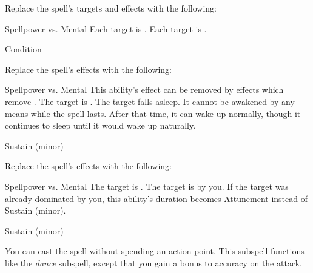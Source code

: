 Replace the spell's targets and effects with the following:
\begin{spellcontent}
\begin{augmenttargetinginfo}
\end{augmenttargetinginfo}
\begin{augmenteffects}
\begin{spellattack}{Spellpower vs. Mental}
\spellsuccess Each target is \disoriented.
\spellcritical Each target is \confused.
\end{spellattack}
\spelldur Condition
\end{augmenteffects}
\end{spellcontent}
Replace the spell's effects with the following:
\begin{spellcontent}
\begin{augmenteffects}
\begin{spellattack}{Spellpower vs. Mental}
\spellspecial This ability's effect can be removed by effects which remove .
\spellsuccess The target is \blinded.
\spellcritical
The target falls asleep.
It cannot be awakened by any means while the spell lasts.
After that time, it can wake up normally, though it continues to sleep until it would wake up naturally.
\end{spellattack}
\spelldur Sustain (minor)
\end{augmenteffects}
\end{spellcontent}
Replace the spell's effects with the following:
\begin{spellcontent}
\begin{augmenteffects}
\begin{spellattack}{Spellpower vs. Mental}
\spellsuccess The target is .
\spellcritical
The target is  by you.
If the target was already dominated by you, this ability's duration becomes Attunement instead of Sustain (minor).
\end{spellattack}
\spelldur Sustain (minor)
\end{augmenteffects}
\end{spellcontent}
You can cast the spell without spending an action point.
This subspell functions like the \textit{dance} subspell, except that you gain a  bonus to accuracy on the attack.
